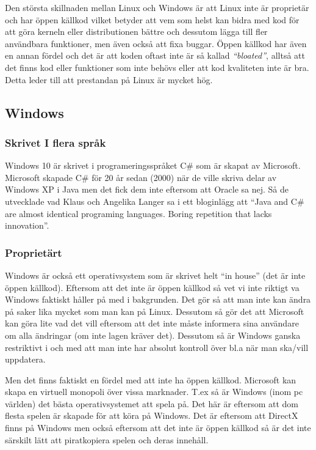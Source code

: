 \documentclass[12pt, a4paper]{report}
\begin{document}
   Den största skillnaden mellan Linux och Windows är att Linux inte är proprietär och har öppen källkod vilket betyder att vem som helst kan bidra med kod för att göra kerneln eller distributionen bättre och dessutom lägga till fler användbara funktioner, men även också att fixa buggar. Öppen källkod har även en annan fördel och det är att koden oftast inte är så kallad \textit{``bloated''}, alltså att det finns kod eller funktioner som inte behövs eller att kod kvaliteten inte är bra. Detta leder till att prestandan på Linux är mycket hög.

   \subsection{Windows}


    \subsubsection{Skrivet I flera språk}
    
    Windows 10 är skrivet i programeringsspråket C\# som är skapat av Microsoft\cite{c}. Microsoft skapade C\# för 20 år sedan (2000) när de ville skriva delar av Windows XP i Java men det fick dem inte eftersom att Oracle sa nej. Så de utvecklade vad Klaus och Angelika Langer sa i ett bloginlägg att ``Java and C\# are almost identical programing languages. Boring repetition that lacks innovation''.\cite{cquote}  
    

    \subsubsection{Proprietärt}
    Windows är också ett operativsystem som är skrivet helt ``in house'' (det är inte öppen källkod).
    Eftersom att det inte är öppen källkod så vet vi inte riktigt va Windows faktiskt håller på med i bakgrunden. Det gör så att man inte kan ändra på saker lika mycket som man kan på Linux. Dessutom så gör det att Microsoft kan göra lite vad det vill eftersom att det inte måste informera sina användare om alla ändringar (om inte lagen kräver det). Dessutom så är Windows ganska restriktivt i och med att man inte har absolut kontroll över bl.a när man ska/vill uppdatera.


   Men det finns faktiskt en fördel med att inte ha öppen källkod. Microsoft kan skapa en virtuell monopoli över vissa marknader. T.ex så är Windows (inom pc världen) det bästa operativsystemet att spela på. Det här är eftersom att dom flesta spelen är skapade för att köra på Windows. Det är eftersom att DirectX\cite{directx} finns på Windows men också eftersom att det inte är öppen källkod så är det inte särskilt lätt att piratkopiera spelen och deras innehåll.
\end{document}
